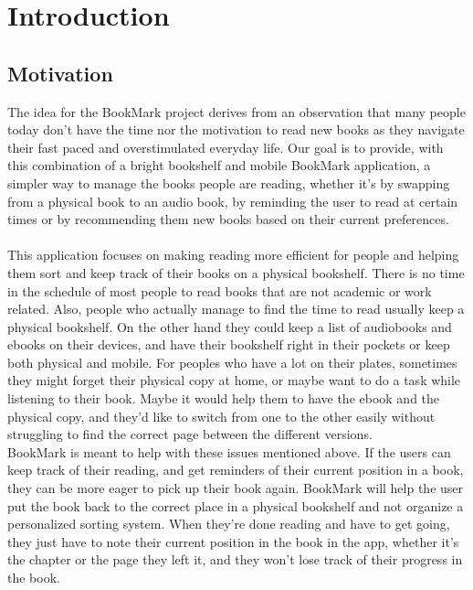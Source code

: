 \documentclass[conference]{IEEEtran}
\begin{document}
\section{Introduction}

\subsection*{Motivation}
The idea for the BookMark project derives from an observation that many people today don't have the time nor the motivation to read new books as they navigate their fast paced and overstimulated everyday life. Our goal is to provide, with this combination of a bright bookshelf and mobile BookMark application, a simpler way to manage the books people are reading, whether it's by swapping from a physical book to an audio book, by reminding the user to read at certain times or by recommending them new books based on their current preferences. \\ \\


This application focuses on making reading more efficient for people and helping them sort and keep track of their books on a physical bookshelf. There is no time in the schedule of most people to read books that are not academic or work related. Also, people who actually manage to find the time to read usually keep a physical bookshelf. On the other hand they could keep a list of audiobooks and ebooks on their devices, and have their bookshelf right in their pockets or keep both physical and mobile. For peoples who have a lot on their plates, sometimes they might forget their physical copy at home, or maybe want to do a task while listening to their book. Maybe it would help them to have the ebook and the physical copy, and they'd like to switch from one to the other easily without struggling to find the correct page between the different versions.\\
BookMark is meant to help with these issues mentioned above. If the users can keep track of their reading, and get reminders of their current position in a book, they can be more eager to pick up their book again. BookMark will help the user put the book back to the correct place in a physical bookshelf and not organize a personalized sorting system. When they're done reading and have to get going, they just have to note their current position in the book in the app, whether it's the chapter or the page they left it, and they won't lose track of their progress in the book. \\ \\
\end{document}
